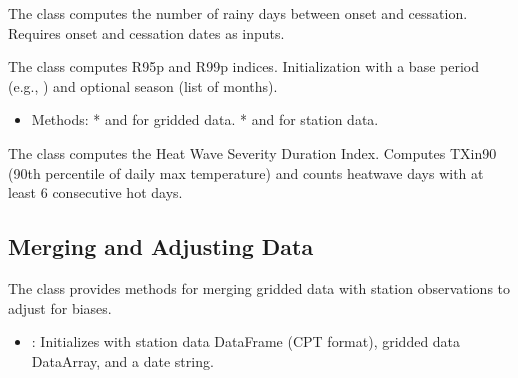 \documentclass[letterpaper,10pt,english]{sphinxmanual}
\begin{document}
\sphinxAtStartPar
{}

\sphinxAtStartPar
The  class computes the number of rainy days between onset and cessation. Requires onset and cessation dates as inputs.

\sphinxAtStartPar
{}

\sphinxAtStartPar
The  class computes R95p and R99p indices. Initialization with a base period (e.g., ) and optional season (list of months).
\begin{itemize}
\item {} 
\sphinxAtStartPar
Methods:
*  and  for gridded data.
*  and  for station data.

\end{itemize}

\sphinxAtStartPar
{}

\sphinxAtStartPar
The  class computes the Heat Wave Severity Duration Index. Computes TXin90 (90th percentile of daily max temperature) and counts heatwave days with at least 6 consecutive hot days.


\subsection{Merging and Adjusting Data}
\label{\detokenize{Processing:merging-and-adjusting-data}}
\sphinxAtStartPar
The  class provides methods for merging gridded data with station observations to adjust for biases.

\sphinxAtStartPar
{}
\begin{itemize}
\item {} 
\sphinxAtStartPar
{}: Initializes with station data DataFrame (CPT format), gridded data DataArray, and a date string.

\end{itemize}
\end{document}
